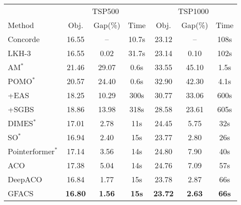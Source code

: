 \documentclass{article}
\begin{document}

\begin{table}[H]
\centering
\footnotesize
\setlength{\tabcolsep}{2pt}
\renewcommand{\arraystretch}{1.2}

\noindent
\begin{minipage}[t]{0.495\textwidth}
\vspace*{0pt}
\centering
\begin{tabular}{l ccc ccc}
\toprule[1pt]
& \multicolumn{3}{c}{TSP500} & \multicolumn{3}{c}{TSP1000}\\
\cmidrule(lr){2-4}\cmidrule(lr){5-7}
Method & Obj. & Gap(\%) & Time & Obj. & Gap(\%) & Time \\
\midrule[1pt]
Concorde           & 16.55 & --    & 10.7s & 23.12 & --   & 108s \\
LKH-3              & 16.55 & 0.02  & 31.7s & 23.14 & 0.10 & 102s \\
\cmidrule(lr){1-1}\cmidrule(lr){2-4}\cmidrule(lr){5-7}
AM$^*$             & 21.46 & 29.07 & 0.6s & 33.55 & 45.10 & 1.5s \\
POMO$^*$           & 20.57 & 24.40 & 0.6s & 32.90 & 42.30 & 4.1s \\
\quad +EAS         & 18.25 & 10.29 & 300s & 30.77 & 33.06 & 600s \\
\quad +SGBS        & 18.86 & 13.98 & 318s & 28.58 & 23.61 & 605s \\
DIMES$^*$          & 17.01 & 2.78  & 11s  & 24.45 & 5.75  & 32s \\
SO$^*$             & 16.94 & 2.40  & 15s  & 23.77 & 2.80  & 26s \\
Pointerformer$^*$  & 17.14 & 3.56  & 14s  & 24.80 & 7.90  & 40s \\
\cmidrule(lr){1-1}\cmidrule(lr){2-4}\cmidrule(lr){5-7}
ACO                & 17.38 & 5.04 & 14s & 24.76 & 7.09 & 57s \\
DeepACO            & 16.84 & 1.77 & 15s & 23.78 & 2.87 & 66s \\
GFACS & \textbf{16.80} & \textbf{1.56} & \textbf{15s} &
\textbf{23.72} & \textbf{2.63} & \textbf{66s} \\
\bottomrule[1pt]
\end{tabular}
\end{minipage}
\hfill
\begin{minipage}[t]{0.495 \textwidth}
\vspace*{0pt}
\centering
\begin{tabular}{l ccc ccc}
\toprule[1pt]

\end{tabular}
\end{minipage}
\end{table}
\end{document}
